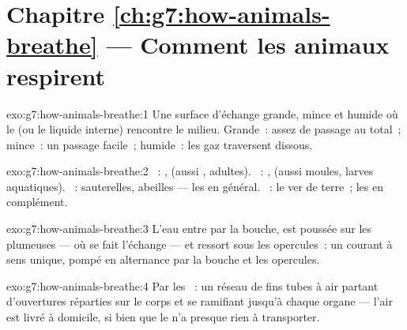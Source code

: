 \section*{Chapitre \ref{ch:g7:how-animals-breathe} --- Comment les animaux respirent}

\begin{solution}{exo:g7:how-animals-breathe:1}
Une surface d'échange grande, mince et humide où le  (ou le
liquide interne) rencontre le milieu. Grande~: assez de passage au
total~; mince~: un passage facile~; humide~: les gaz traversent
dissous.
\end{solution}

\begin{solution}{exo:g7:how-animals-breathe:2}
~: ,  (aussi ,  adultes).
~: ,  (aussi moules, larves aquatiques).
~: sauterelles, abeilles --- les  en général.
~: le ver de terre~; les  en
complément.
\end{solution}

\begin{solution}{exo:g7:how-animals-breathe:3}
L'eau entre par la bouche, est poussée sur les  plumeuses
--- où se fait l'échange --- et ressort sous les opercules~: un
courant à sens unique, pompé en alternance par la bouche et les
opercules.
\end{solution}

\begin{solution}{exo:g7:how-animals-breathe:4}
Par les ~: un réseau de fins tubes à air partant
d'ouvertures réparties sur le corps et se ramifiant jusqu'à chaque
organe --- l'air est livré à domicile, si bien que le  n'a
presque rien à transporter.
\end{solution}

